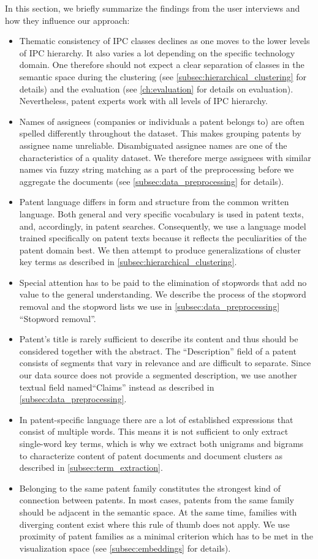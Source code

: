 In this section, we briefly summarize the findings from the user interviews and how they influence our approach:
\begin{itemize}
\item Thematic consistency of IPC classes declines as one moves to the lower levels of IPC hierarchy. 
It also varies a lot depending on the specific technology domain.
One therefore should not expect a clear separation of classes in the semantic space during the clustering (see \autoref{subsec:hierarchical_clustering} for details) and the evaluation (see \autoref{ch:evaluation} for details on evaluation).
Nevertheless, patent experts work with all levels of IPC hierarchy.
\item Names of assignees (companies or individuals a patent belongs to) are often spelled differently throughout the dataset.
This makes grouping patents by assignee name unreliable.
Disambiguated assignee names are one of the characteristics of a quality dataset.
We therefore merge assignees with similar names via fuzzy string matching as a part of the preprocessing before we aggregate the documents (see \autoref{subsec:data_preprocessing} for details).
\item Patent language differs in form and structure from the common written language. 
Both general and very specific vocabulary is used in patent texts, and, accordingly, in patent searches.
Consequently, we use a language model trained specifically on patent texts because it reflects the peculiarities of the patent domain best.
We then attempt to produce generalizations of cluster key terms as described in \autoref{subsec:hierarchical_clustering}.
\item Special attention has to be paid to the elimination of stopwords that add no value to the general understanding. We describe the process of the stopword removal and the stopword lists we use in \autoref{subsec:data_preprocessing} ``Stopword removal''.
\item Patent's title is rarely sufficient to describe its content and thus should be considered together with the abstract. 
The ``Description'' field of a patent consists of segments that vary in relevance and are difficult to separate.
Since our data source does not provide a segmented description, we use another textual field named``Claims'' instead as described in \autoref{subsec:data_preprocessing}.
\item In patent-specific language there are a lot of established expressions that consist of multiple words.
This means it is not sufficient to only extract single-word key terms, which is why we extract both unigrams and bigrams to characterize content of patent documents and document clusters as described in \autoref{subsec:term_extraction}.
\item Belonging to the same patent family constitutes the strongest kind of connection between patents.
In most cases, patents from the same family should be adjacent in the semantic space.
At the same time, families with diverging content exist where this rule of thumb does not apply.
We use proximity of patent families as a minimal criterion which has to be met in the visualization space (see \autoref{subsec:embeddings} for details).
\end{itemize}